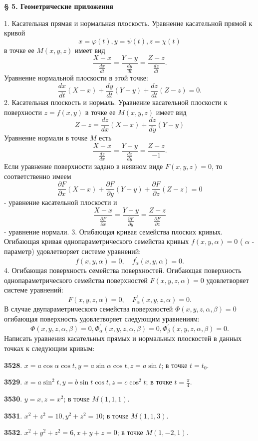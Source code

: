 \documentclass{article}
\begin{document}
\textbf{§ 5. Геометрические приложения}

1. Касательная прямая и нормальная плоскость. Уравнение касательной прямой к кривой
$$
x=\varphi(t), y=\psi(t), z=\chi(t)
$$
в точке ее $M(x, y, z)$ имеет вид
$$
\frac{X-x}{\frac{d x}{d t}}=\frac{Y-y}{\frac{d y}{d t}}=\frac{Z-z}{\frac{d z}{d t}} .
$$
Уравнение нормальной плоскости в этой точке:
$$
\frac{d x}{d t}(X-x)+\frac{d y}{d t}(Y-y)+\frac{d z}{d t}(Z-z)=0 .
$$
2. Касательная плоскость и нормаль. Уравнение касательной плоскости к поверхности $z=f(x, y)$ в точке ее $M(x, y, z)$ имеет вид
$$
Z-z=\frac{d z}{d x}(X-x)+\frac{d z}{d y}(Y-y)
$$
Уравнение нормали в точке $M$ есть
$$
\frac{X-x}{\frac{d z}{d x}}=\frac{Y-y}{\frac{d z}{d y}}=\frac{Z-z}{-1} .
$$
Если уравнение поверхности задано в неявном виде $F(x, y, z)=0$, то соответственно имеем
$$
\frac{\partial F}{\partial x}(X-x)+\frac{\partial F}{\partial y}(Y-y)+\frac{\partial F}{\partial z}(Z-z)=0
$$
- уравнение касательной плоскости и
$$
\frac{X-x}{\frac{\partial F}{\partial x}}=\frac{Y-y}{\frac{\partial F}{\partial y}}=\frac{Z-z}{\frac{\partial F}{\partial z}}
$$
- уравнение нормали.
3. Огибающая кривая семейства плоских кривых. Огибающая кривая однопараметрического семейства кривых $f(x, y, \alpha)=0$ ( $\alpha$ - параметр) удовлетворяет системе уравнений:
$$
f(x, y, \alpha)=0, \quad f_\alpha^{\prime}(x, y, \alpha)=0 .
$$
4. Огибающая поверхность семейства поверхностей. Огибающая поверхность однопараметрического семейства поверхностей $F(x, y, z, \alpha)=0$ удовлетворяет системе уравнений:
$$
F(x, y, z, \alpha)=0, \quad F_\alpha^{\prime}(x, y, z, \alpha)=0 .
$$
В случае двупараметрического семейства поверхностей $\Phi(x, y, z, \alpha, \beta)=0$ огибающая поверхность удовлетворяет следующим уравнениям:
$$
\Phi(x, y, z, \alpha, \beta)=0, \Phi_\alpha^{\prime}(x, y, z, \alpha, \beta)=0, \Phi_\beta^{\prime}(x, y, z, \alpha, \beta)=0 .
$$
Написать уравнения касательных прямых и нормальных плоскостей в данных точках к следующим кривым:

\textbf{3528}. $x=a \cos \alpha \cos t, y=a \sin \alpha \cos t, z=a \sin t$; в точке $t=t_0$.

\textbf{3529}. $x=a \sin ^2 t, y=b \sin t \cos t, z=c \cos ^2 t$; в точке $t=\frac{\pi}{4}$.

\textbf{3530}. $y=x, z=x^2$; в точке $M(1,1,1)$.

\textbf{3531}. $x^2+z^2=10, y^2+z^2=10$; в точке $M(1,1,3)$.

\textbf{3532}. $x^2+y^2+z^2=6, x+y+z=0$; в точке $M(1,-2,1)$.
\end{document}
